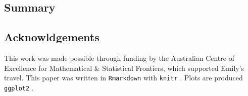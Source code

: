 \hypertarget{summary}{%
\subsection{Summary}\label{summary}}

\hypertarget{acknowldgements}{%
\subsection{Acknowldgements}\label{acknowldgements}}

This work was made possible through funding by the Australian Centre of
Excellence for Mathematical \& Statistical Frontiers, which supported
Emily's travel. This paper was written in \texttt{Rmarkdown}
\citep{rmarkdown_pkg, rmarkdown, rmarkdown_cookbook} with \texttt{knitr}
\citep{knitr_pkg, knitr}. Plots are produced \texttt{ggplot2}
\citep{ggplot2}.

\clearpage




\address{%
Weihao Li\\
Monash University\\%
Econometrics and Business Statistics\\
%
%
%
\\\href{mailto:weihao.li@monash.edu}{\nolinkurl{weihao.li@monash.edu}}
}

\address{%
Emily Dodwell\\
??\\%
line 1\\ line 2\\
%
%
%
\\\href{mailto:emdodwell@gmail.com}{\nolinkurl{emdodwell@gmail.com}}
}

\address{%
Dianne Cook\\
Monash University\\%
Econometrics and Business Statistics\\
%
%
%
\\\href{mailto:dicook@monash.edu}{\nolinkurl{dicook@monash.edu}}
}
